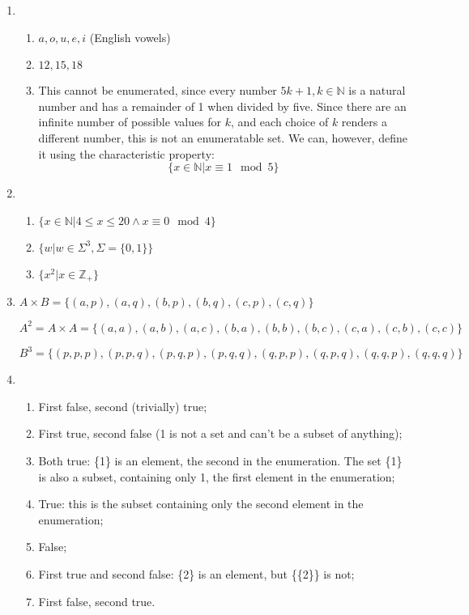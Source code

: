 \documentclass{article}
\begin{document}
\begin{enumerate}
    \item
        \begin{enumerate}
            \item ${a, o, u, e, i}$ (English vowels)
            \item ${12,15,18}$
            \item This cannot be enumerated, since every number $5k + 1, k \in \mathbb{N}$ is a natural number and has a remainder of 1 when divided by five. Since there are an infinite number of possible values for $k$, and each choice of $k$ renders a different number, this is not an enumeratable set. We can, however, define it using the characteristic property:
                $$\{x \in \mathbb{N} | x \equiv 1 \mod{5}\} $$
        \end{enumerate}
    \item
        \begin{enumerate}
            \item $\{ x \in \mathbb{N} | 4 \leq x \leq 20 \land x \equiv 0 \mod{4}\}$
            \item $\{ w | w \in \Sigma^3, \Sigma = \{0,1\} \}$
            \item $\{ x^2 | x \in \mathbb{Z}_+\}$
        \end{enumerate}

    \item
        $A \times B = \{(a,p), (a,q),(b,p),(b,q), (c,p),(c,q)\}$

        $A^2 = A \times A = \{(a,a), (a,b), (a,c), (b,a), (b,b), (b,c),(c,a), (c,b), (c,c)\}$

        $B^3 =  \{ (p,p,p), (p,p,q), (p,q,p), (p,q,q), (q,p,p),(q,p,q),(q,q,p), (q,q,q)\}$

    \item
        \begin{enumerate}
            \item First false, second (trivially) true;
            \item First true, second false (1 is not a set and can't be a subset of anything);
            \item Both true: \{1\} is an element, the second in the enumeration. The set \{1\} is also a subset, containing only 1, the first element in the enumeration;
            \item True: this is the subset containing only the second element in the enumeration;
            \item False;
            \item First true and second false: \{2\} is an element, but \{\{2\}\} is not;
            \item First false, second true.
        \end{enumerate}


\end{enumerate}
\end{document}
